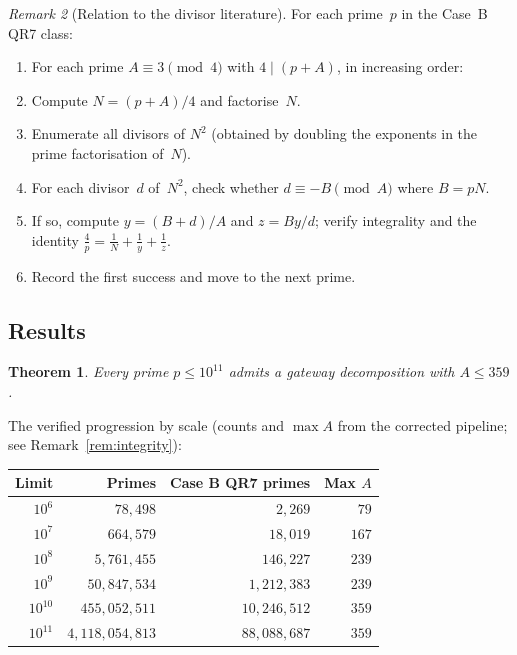 \documentclass[12pt]{amsart}
\newtheorem{theorem}{Theorem}[section]
\theoremstyle{definition}
\theoremstyle{remark}
\newtheorem{remark}[theorem]{Remark}
\begin{document}
\begin{remark}[Relation to the divisor literature]
For each prime~$p$ in the Case~B QR7 class:
\begin{enumerate}
  \item For each prime $A \equiv 3 \pmod 4$ with $4 \mid (p+A)$,
        in increasing order:
  \item Compute $N = (p+A)/4$ and factorise~$N$.
  \item Enumerate all divisors of $N^2$ (obtained by doubling the exponents
        in the prime factorisation of~$N$).
  \item For each divisor~$d$ of~$N^2$, check whether $d \equiv -B \pmod{A}$
        where $B = pN$.
  \item If so, compute $y = (B+d)/A$ and $z = By/d$; verify integrality
        and the identity $\frac{4}{p} = \frac{1}{N} + \frac{1}{y} + \frac{1}{z}$.
  \item Record the first success and move to the next prime.
\end{enumerate}

\subsection{Results}

\begin{theorem}\label{thm:verification}
Every prime $p \leq 10^{11}$ admits a gateway decomposition with
$A \leq 359$.
\end{theorem}

The verified progression by scale
(counts and $\max A$ from the corrected pipeline; see
Remark~\ref{rem:integrity}):

\begin{center}
\begin{tabular}{@{}rrrr@{}}
\toprule
Limit & Primes & Case B QR7 primes & Max $A$ \\
\midrule
$10^6$ & $78{,}498$ & $2{,}269$ & $79$ \\
$10^7$ & $664{,}579$ & $18{,}019$ & $167$ \\
$10^8$ & $5{,}761{,}455$ & $146{,}227$ & $239$ \\
$10^9$ & $50{,}847{,}534$ & $1{,}212{,}383$ & $239$ \\
$10^{10}$ & $455{,}052{,}511$ & $10{,}246{,}512$ & $359$ \\
$10^{11}$ & $4{,}118{,}054{,}813$ & $88{,}088{,}687$ & $359$ \\
\bottomrule
\end{tabular}
\end{center}


\end{remark}
\end{document}
